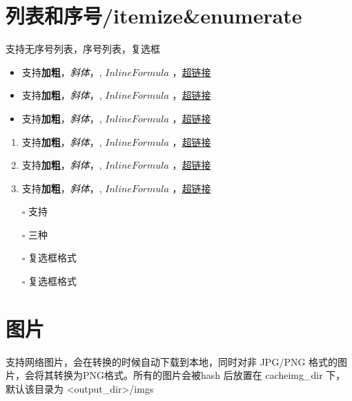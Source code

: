 \documentclass{article}%
\begin{document}
%
\section{列表和序号/itemize\&enumerate}%

%

%
支持无序号列表，序号列表，复选框%

%
\begin{itemize}%
\item%
支持\textbf{加粗}，\textit{斜体}，, $Inline Formula$ ，\href{http:///www.github.com}{超链接}%
\item%
支持\textbf{加粗}，\textit{斜体}，, $Inline Formula$ ，\href{http:///www.github.com}{超链接}%
\item%
支持\textbf{加粗}，\textit{斜体}，, $Inline Formula$ ，\href{http:///www.github.com}{超链接}%
\end{itemize}%
%

%
\begin{enumerate}%
\item%
支持\textbf{加粗}，\textit{斜体}，, $Inline Formula$ ，\href{http:///www.github.com}{超链接}%
\item%
支持\textbf{加粗}，\textit{斜体}，, $Inline Formula$ ，\href{http:///www.github.com}{超链接}%
\item%
支持\textbf{加粗}，\textit{斜体}，, $Inline Formula$ ，\href{http:///www.github.com}{超链接}%
\end{enumerate}%
%

%
\begin{itemize}%
\item[\rlap{\raisebox{0.3ex}{\hspace{0.4ex}\scriptsize \ding{56}}}$\square$]%
支持%
\item[$\square$]%
三种%
\item[\rlap{\raisebox{0.3ex}{\hspace{0.4ex}\tiny \ding{52}}}$\square$]%
复选框格式%
\item[$\square$]%
复选框格式%
\end{itemize}%
%

%
\section{图片}%

%
支持网络图片，会在转换的时候自动下载到本地，同时对非 JPG/PNG 格式的图片，会将其转换为PNG格式。所有的图片会被hash 后放置在 cacheimg\_dir 下，默认该目录为 <output\_dir>/imgs%
\end{document}
